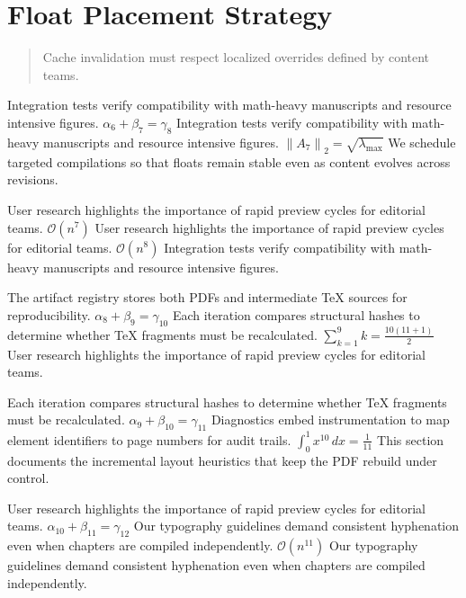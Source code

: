     \section{Float Placement Strategy}
    
    \begin{quote}
      Cache invalidation must respect localized overrides defined by content teams.
    \end{quote}
  
    Integration tests verify compatibility with math-heavy manuscripts and resource intensive figures.  $\alpha_{6} + \beta_{7} = \gamma_{8}$  Integration tests verify compatibility with math-heavy manuscripts and resource intensive figures.  $\left\|A_{7}\right\|_{2} = \sqrt{\lambda_{\max}}$  We schedule targeted compilations so that floats remain stable even as content evolves across revisions.
    \par
  
    User research highlights the importance of rapid preview cycles for editorial teams.  $\mathcal{O}(n^{7})$  User research highlights the importance of rapid preview cycles for editorial teams.  $\mathcal{O}(n^{8})$  Integration tests verify compatibility with math-heavy manuscripts and resource intensive figures.
    \par
  
    The artifact registry stores both PDFs and intermediate TeX sources for reproducibility.  $\alpha_{8} + \beta_{9} = \gamma_{10}$  Each iteration compares structural hashes to determine whether TeX fragments must be recalculated.  $\sum_{k=1}^{9} k = \frac{10(11+1)}{2}$  User research highlights the importance of rapid preview cycles for editorial teams.
    \par
  
    Each iteration compares structural hashes to determine whether TeX fragments must be recalculated.  $\alpha_{9} + \beta_{10} = \gamma_{11}$  Diagnostics embed instrumentation to map element identifiers to page numbers for audit trails.  $\int_{0}^{1} x^{10} \, dx = \frac{1}{11}$  This section documents the incremental layout heuristics that keep the PDF rebuild under control.
    \par
  
    User research highlights the importance of rapid preview cycles for editorial teams.  $\alpha_{10} + \beta_{11} = \gamma_{12}$  Our typography guidelines demand consistent hyphenation even when chapters are compiled independently.  $\mathcal{O}(n^{11})$  Our typography guidelines demand consistent hyphenation even when chapters are compiled independently.
    \par
  
